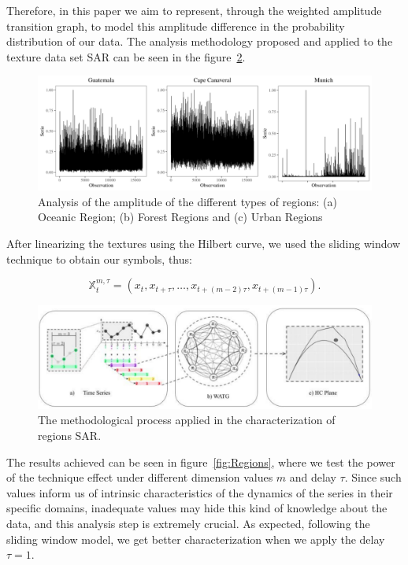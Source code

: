 \documentclass{isprs}
\begin{document}
	Therefore, in this paper we aim to represent, through the weighted amplitude transition graph, to model this amplitude difference in the probability distribution of our data.
	The analysis methodology proposed and applied to the texture data set SAR can be seen in the figure~\ref{fig:WATG}.
	
	\begin{figure}[hbt]
		\includegraphics[scale = 0.28]{Figures/SAR_signal.pdf}
		\caption{Analysis of the amplitude of the different types of regions: (a) Oceanic Region; (b) Forest Regions and (c) Urban Regions}
		\label{fig:AmplitudeSAR}
	\end{figure}
	
	After linearizing the textures using the Hilbert curve, we used the sliding window technique to obtain our symbols, thus:
	
	\begin{equation}
	\mathbb{X}_t^{m,\tau} = (x_{t}, x_{t+\tau},\ldots, x_{t+(m-2)\tau} ,x_{t+(m-1)\tau}).
	\end{equation}
	
	\begin{figure}[hbt]
		\centering
		\includegraphics[scale = 0.25]{Figures/WATG.pdf}
		\caption{The methodological process applied in the characterization of regions SAR.}
		\label{fig:WATG}
	\end{figure}
	
	The results achieved can be seen in figure~\ref{fig:Regions}, where we test the power of the technique effect under different dimension values $m$ and delay $\tau$.
	Since such values inform us of intrinsic characteristics of the dynamics of the series in their specific domains, inadequate values may hide this kind of knowledge about the data, and this analysis step is extremely crucial.
	As expected, following the sliding window model, we get better characterization when we apply the delay $\tau = 1$.
	
\end{document}
